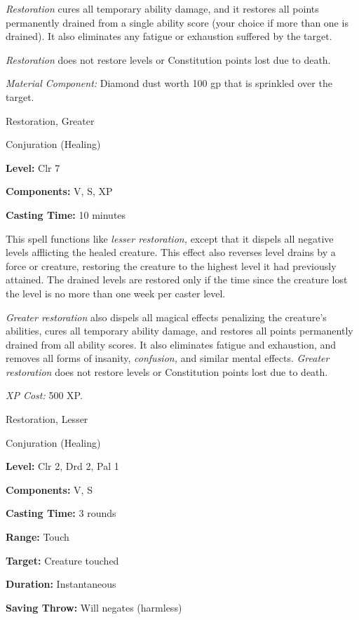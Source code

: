 \documentclass{article}
\begin{document}
\textit{Restoration }cures all temporary ability damage, and it restores all points 
permanently drained from a single ability score (your choice if more than one is 
drained). It also eliminates any fatigue or exhaustion suffered by the target. 

\textit{Restoration }does not restore levels or Constitution points lost due to 
death.

\textit{Material Component: }Diamond dust worth 100 gp that is sprinkled over the 
target.

\vspace{12pt}
Restoration, Greater

Conjuration (Healing)

\textbf{Level:} Clr 7

\textbf{Components:} V, S, XP

\textbf{Casting Time:} 10 minutes

This spell functions like \textit{lesser restoration, }except that it dispels all 
negative levels afflicting the healed creature. This effect also reverses level 
drains by a force or creature, restoring the creature to the highest level it had 
previously attained. The drained levels are restored only if the time since the 
creature lost the level is no more than one week per caster level.

\textit{Greater restoration }also dispels all magical effects penalizing the creature's 
abilities, cures all temporary ability damage, and restores all points permanently 
drained from all ability scores. It also eliminates fatigue and exhaustion, and 
removes all forms of insanity, \textit{confusion, }and similar mental effects. 
\textit{Greater restoration }does not restore levels or Constitution points lost 
due to death.

\textit{XP Cost: }500 XP.

\vspace{12pt}
Restoration, Lesser

Conjuration (Healing)

\textbf{Level:} Clr 2, Drd 2, Pal 1

\textbf{Components:} V, S

\textbf{Casting Time:} 3 rounds

\textbf{Range:} Touch

\textbf{Target:} Creature touched

\textbf{Duration:} Instantaneous

\textbf{Saving Throw: }Will negates (harmless)
\end{document}
